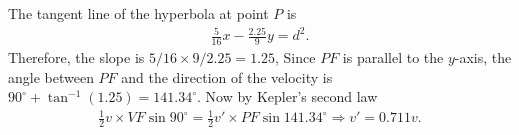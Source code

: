 \documentclass{article}
\begin{document}
\begin{enumerate}
  The tangent line of the hyperbola at point $P$ is
  \begin{align*}
    \frac{5}{16}x - \frac{2.25}{9}y = d^2.
  \end{align*}
  Therefore, the slope is $5/16\times 9/2.25 = 1.25$, Since $PF$ is parallel to the $y$-axis, the angle between $PF$ and the direction of the velocity is $90^\circ + \tan ^{-1}(1.25) = 141.34^\circ$. Now by Kepler's second law
  \begin{align*}
   \frac{1}{2}v\times VF \sin 90^\circ = \frac{1}{2} v' \times  PF \sin 141.34^\circ\Rightarrow v' = 0.711v.
  \end{align*}

   \begin{figure}[ht]
    \centering
  \end{figure}

  
\end{enumerate}
\end{document}

